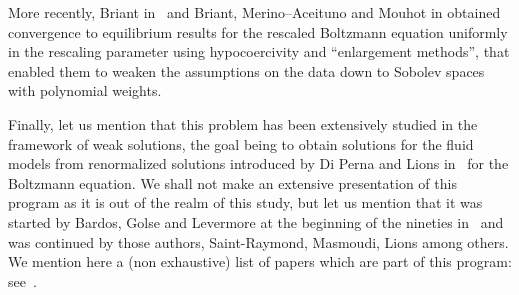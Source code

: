\documentclass[11pt]{article}
\theoremstyle{definition}
\numberwithin{equation}{section}
\numberwithin{figure}{section}
\numberwithin{table}{section}
\begin{document}
More recently, Briant in~\cite{Briant} and Briant, Merino--Aceituno and Mouhot in\linebreak\cite{Briant-Mouhot-Merino} obtained convergence to equilibrium results for the rescaled Boltzmann equation uniformly in the rescaling parameter using hypocoercivity and ``enlargement methods'', that enabled them to weaken the assumptions on the data down to Sobolev spaces with polynomial weights.

Finally, let us mention that this problem has been extensively studied in the framework of weak solutions, the goal being to obtain solutions for the fluid models from renormalized solutions introduced by Di Perna and Lions in~\cite{DiPerna-Lions} for the Boltzmann equation. We shall not make an extensive presentation of this program as it is out of the realm of this study, but let us mention that it was started by Bardos, Golse and Levermore at the beginning of the nineties in~\cite{bgl1,bgl2} and was continued by those authors, Saint-Raymond, Masmoudi, Lions among others. We mention here a (non exhaustive) list of papers which are part of this program: see~\cite{GSR1,GSR2,Levermore-Masmoudi,lionsmasmoudi,Saint-Raymond}.
\end{document}
